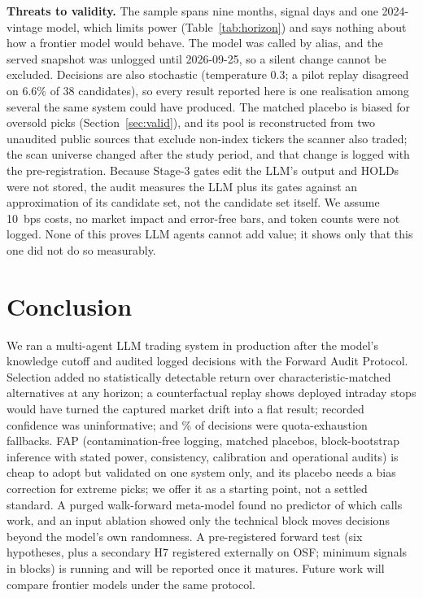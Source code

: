 \documentclass[conference]{IEEEtran}
\begin{document}
\textbf{Threats to validity.} The sample spans nine months, \nDays{} signal days and one 2024-vintage model, which limits power (Table~\ref{tab:horizon}) and says nothing about how a frontier model would behave. The model was called by alias, and the served snapshot was unlogged until 2026-09-25, so a silent change cannot be excluded. Decisions are also stochastic (temperature 0.3; a pilot replay disagreed on 6.6\% of 38 candidates), so every result reported here is one realisation among several the same system could have produced. The matched placebo is biased for oversold picks (Section~\ref{sec:valid}), and its pool is reconstructed from two unaudited public sources that exclude \nNonIndex{} non-index tickers the scanner also traded; the scan universe changed after the study period, and that change is logged with the pre-registration. Because Stage-3 gates edit the LLM's output and HOLDs were not stored, the audit measures the LLM plus its gates against an approximation of its candidate set, not the candidate set itself. We assume 10~bps costs, no market impact and error-free bars, and token counts were not logged. None of this proves LLM agents cannot add value; it shows only that this one did not do so measurably.

\section{Conclusion}
We ran a multi-agent LLM trading system in production after the model's knowledge cutoff and audited \nRaw{} logged decisions with the Forward Audit Protocol. Selection added no statistically detectable return over characteristic-matched alternatives at any horizon; a counterfactual replay shows deployed intraday stops would have turned the captured market drift into a flat result; recorded confidence was uninformative; and \opFallbackPct\% of decisions were quota-exhaustion fallbacks. FAP (contamination-free logging, matched placebos, block-bootstrap inference with stated power, consistency, calibration and operational audits) is cheap to adopt but validated on one system only, and its placebo needs a bias correction for extreme picks; we offer it as a starting point, not a settled standard. A purged walk-forward meta-model found no predictor of which calls work, and an input ablation showed only the technical block moves decisions beyond the model's own randomness. A pre-registered forward test (six hypotheses, plus a secondary H7 registered externally on OSF; minimum \fwdNeedS{} signals in \fwdNeedB{} blocks) is running and will be reported once it matures. Future work will compare frontier models under the same protocol.
\end{document}
